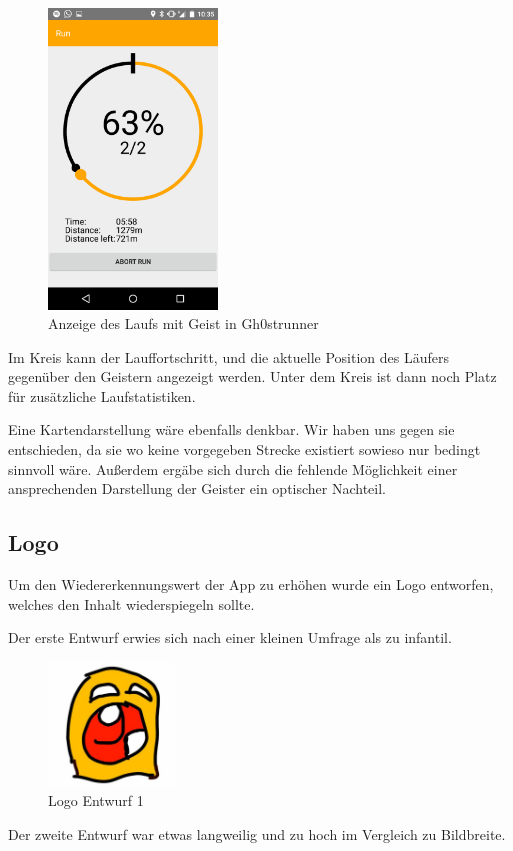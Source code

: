 \begin {figure}[!hb]\label{fig:runscreen}
\centering
\includegraphics[width=0.4\textwidth]{abb/bsp/bsp19}
\caption{Anzeige des Laufs mit Geist in Gh0strunner}
\end{figure}

Im Kreis kann der Lauffortschritt, und die aktuelle Position des Läufers gegenüber den Geistern angezeigt werden. Unter dem Kreis ist dann noch Platz für zusätzliche Laufstatistiken. 

Eine Kartendarstellung wäre ebenfalls denkbar. Wir haben uns gegen sie entschieden, da sie wo keine vorgegeben Strecke existiert sowieso nur bedingt sinnvoll wäre. Außerdem ergäbe sich durch die fehlende Möglichkeit einer ansprechenden Darstellung der Geister ein optischer Nachteil.
\subsection{Logo}
Um den Wiedererkennungswert der App zu erhöhen wurde ein Logo entworfen, welches den Inhalt wiederspiegeln sollte.

Der erste Entwurf erwies sich nach einer kleinen Umfrage als zu infantil.

\begin{figure}[!h]
\centering
\includegraphics[width=0.3\textwidth]{abb/icon_entwurf1}
\caption{Logo Entwurf 1}
\end{figure}
Der zweite Entwurf war etwas langweilig und zu hoch im Vergleich zu Bildbreite. 

